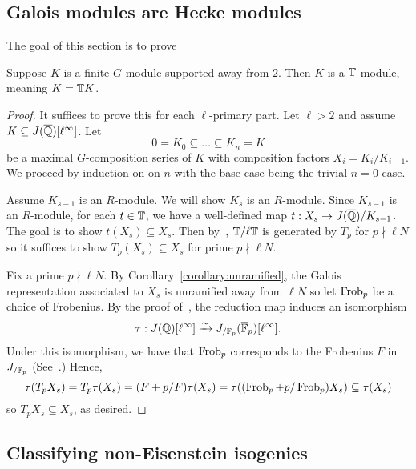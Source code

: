 \documentclass{article}
\begin{document}
\subsection{Galois modules are Hecke modules}

The goal of this section is to prove
\begin{theorem}
    Suppose $K$ is a finite $G$-module supported away from $2$. Then $K$ is a
    $\mathbb{T}$-module, meaning $K=\mathbb{T} K$.
\end{theorem}

\begin{proof}
    It suffices to prove this for each $\ell$-primary part. Let $\ell>2$ and
    assume $K\subseteq J(\overline{\mathbb{Q}})[\ell^\infty]$. Let
    \[
        0 = K_0 \subseteq \ldots \subseteq K_n = K
    \]
    be a maximal $G$-composition series of $K$ with composition factors $X_i =
    K_i/K_{i-1}$. We proceed by induction on on $n$ with the base
    case being the trivial $n=0$ case. 
    
    Assume $K_{s-1}$ is an $R$-module. We will show $K_s$ is an $R$-module.
    Since $K_{s-1}$ is an $R$-module, for each $t\in \mathbb{T}$, we have a
    well-defined map $t:X_s\to J(\overline{\mathbb{Q}})/K_{s-1}$. The goal is to show
    $t(X_s)\subseteq X_s$. Then by~\cite[Prop. 6.1]{MR1610883}, $\mathbb{T}/\ell \mathbb{T}$
    is generated by $T_p$ for $p\nmid \ell N$ so it suffices to show
    $T_p(X_s)\subseteq X_s$ for prime $p\nmid \ell N$.

    Fix a prime $p\nmid \ell N$. By Corollary~\ref{corollary:unramified}, the
    Galois representation associated to $X_s$ is unramified away from $\ell N$
    so let $\operatorname{Frob}_p$ be a choice of Frobenius. By the proof of~\cite[Lemma
    12.6.2]{ribet-stein:mod}, the reduction map induces an isomorphism
    \[
        \tau:J(\mathbb{Q})[\ell^\infty] \xrightarrow{\sim} J_{/\mathbb{F}_p} (\overline{\mathbb{F}}_p)[\ell^\infty].
    \]
    Under this isomorphism, we have that $\operatorname{Frob}_p$ corresponds to the Frobenius
    $F$ in $J_{/\mathbb{F}_p}$ (See~\cite[\S 5.3]{ribet-stein:serre}.) Hence,
    \[
    \tau(T_p X_s) 
    = T_p\tau(X_s) 
    = (F+p/F)\tau(X_s)
    = \tau((\operatorname{Frob}_p+p/\operatorname{Frob}_p)X_s)
    \subseteq \tau(X_s)
    \]
    so $T_p X_s\subseteq X_s$, as desired.
\end{proof}

\subsection{Classifying non-Eisenstein isogenies}


 

\end{document}

